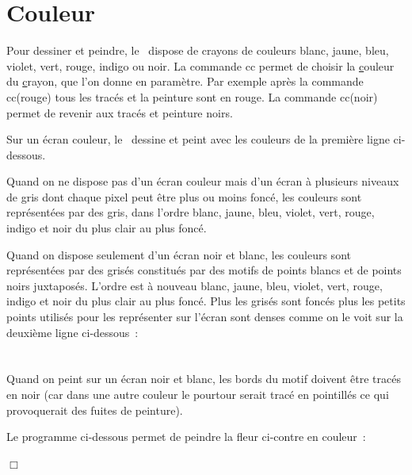 \section{Couleur}

Pour dessiner et peindre, le \robot\ dispose de crayons de couleurs blanc, jaune, bleu, violet, vert, 
rouge, indigo ou noir. La commande {\idt cc} permet de choisir la \underline{c}ouleur du 
\underline{c}rayon, que l'on donne en paramètre. Par exemple après la commande {\idt cc(rouge)} 
tous les tracés et la peinture sont en rouge. La commande {\idt cc(noir)} permet de
revenir aux tracés et peinture noirs.

Sur un écran couleur, le \robot\ dessine et peint avec les couleurs de la première
ligne ci-dessous.

Quand on ne dispose pas d'un écran couleur mais d'un écran à plusieurs niveaux de gris
dont chaque pixel peut être plus ou moins foncé, les
couleurs sont représentées par des gris, dans l'ordre blanc, 
jaune, bleu, violet, vert,  rouge, indigo et noir du plus clair au plus foncé.

Quand on dispose seulement d'un écran noir et blanc, les couleurs sont représentées par des
grisés constitués par des motifs de points blancs et de points noirs juxtaposés. L'ordre est
à nouveau blanc, 
jaune, bleu, violet, vert,  rouge, indigo et noir du plus clair au plus foncé. Plus les grisés sont
foncés plus les petits points utilisés pour les représenter sur l'écran sont denses comme
on le voit sur la deuxième ligne ci-dessous~:\\[1.8cm]
\ \\[1.8cm]
\ \\

Quand on peint sur un écran noir et blanc, les bords du motif doivent être tracés en noir (car
dans une autre couleur le pourtour serait tracé en pointillés ce qui provoquerait
des fuites de peinture). 

\begin{exemple}{\rm
 Le programme ci-dessous permet de peindre la fleur ci-contre en couleur~:\\[5cm]
 \vspace*{-5cm}
 
\noindent $\Box$ }\end{exemple}

